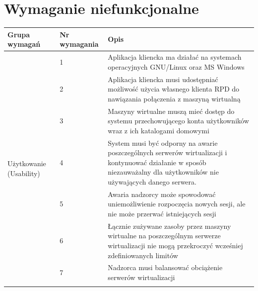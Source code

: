 \documentclass[12pt]{article}
\begin{document}
\newpage
\section{Wymaganie niefunkcjonalne}

\begin{center}
	\begin{table}[h!]
		\begin{tabular}{|p{}|p{}|p{}|}
			\hline Grupa wymagań                            & Nr wymagania & Opis                                                                                                                                                                    \\ \hline
			\multirow[t]{8}{=}{Użytkowanie (Usability)}     & 1            & Aplikacja kliencka ma działać na systemach operacyjnych GNU/Linux oraz MS Windows                                                                                       \\ \cline{2-3}
			                                                & 2            & Aplikacja kliencka musi udostępniać możliwość użycia własnego klienta RPD do nawiązania połączenia z maszyną wirtualną                                                  \\ \cline{2-3}
			                                                & 3            & Maszyny wirtualne muszą mieć dostęp do systemu przechowującego konta użytkowników wraz z ich katalogami domowymi                                                        \\ \hline
			\multirow[t]{7}{=}{Niezawodność (Reliability)}  & 4            & System musi być odporny na awarie poszczególnych serwerów wirtualizacji i kontynuować działanie w sposób niezauważalny dla użytkowników nie używających danego serwera. \\ \cline{2-3}
			                                                & 5            & Awaria nadzorcy może spowodować uniemożliwienie rozpoczęcia nowych sesji, ale nie może przerwać istniejących sesji                                                      \\ \hline
			\multirow[t]{10}{=}{Wydajność (Performance)}    & 6            & Łącznie zużywane zasoby przez maszyny wirtualne na poszczególnym serwerze wirtualizacji nie mogą przekroczyć wcześniej zdefiniowanych limitów                           \\ \cline{2-3}
			                                                & 7            & Nadzorca musi balansować obciążenie serwerów wirtualizacji                                                                                                              \\ \cline{2-3}

\end{tabular}
\end{table}
\end{center}
\end{document}
